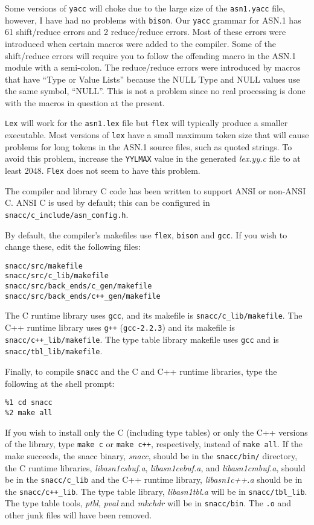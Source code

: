Some versions of \verb$yacc$ will choke due to the large size of the
\verb$asn1.yacc$ file, however, I have had no problems with \verb$bison$.
Our \verb$yacc$ grammar for ASN.1 has 61 shift/reduce errors and 2
reduce/reduce errors.  Most of these errors were introduced when
certain macros were added to the compiler.  Some of the shift/reduce
errors will require you to follow the offending macro in the ASN.1
module with a semi-colon.  The reduce/reduce errors were introduced by
macros that have ``Type or Value Lists'' because the NULL Type and
NULL values use the same symbol, ``NULL''.  This is not a problem
since no real processing is done with the macros in question at the
present.

\verb$Lex$ will work for the \verb$asn1.lex$ file but \verb$flex$ will typically
produce a smaller executable.  Most versions of \verb$lex$ have a small
maximum token size that will cause problems for long tokens in the
ASN.1 source files, such as quoted strings.  To avoid this problem,
increase the \verb$YYLMAX$ value in the generated {\em lex.yy.c} file to at least
2048.  \verb$Flex$ does not seem to have this problem.

The compiler and library C code has been written to support ANSI or
non-ANSI C\@.  ANSI C is used by default; this can be configured in
\verb$snacc/c_include/asn_config.h$.

By default, the compiler's makefiles use \verb$flex$, \verb$bison$ and
\verb$gcc$.  If you wish to change these, edit the following files:

\begin{verbatim}
snacc/src/makefile
snacc/src/c_lib/makefile
snacc/src/back_ends/c_gen/makefile
snacc/src/back_ends/c++_gen/makefile
\end{verbatim}

The C runtime library uses \verb$gcc$, and its makefile is
\verb$snacc/c_lib/makefile$.  The C++ runtime library uses \verb$g++$
(\verb$gcc-2.2.3$) and its makefile is \verb$snacc/c++_lib/makefile$.
The type table library makefile uses \verb$gcc$ and is
\verb$snacc/tbl_lib/makefile$.

Finally, to compile \verb$snacc$ and the C and C++ runtime libraries,
type the following at the shell prompt:

\begin{verbatim}
%1 cd snacc
%2 make all
\end{verbatim}

If you wish to install only the C (including type tables) or only the
C++ versions of the library, type \verb$make c$ or \verb$make c++$,
respectively, instead of \verb$make all$.  If the make succeeds, the
snacc binary, {\em snacc}, should be in the \verb$snacc/bin/$
directory, the C runtime libraries, {\em libasn1csbuf.a}, {\em
libasn1cebuf.a}, and {\em libasn1cmbuf.a}, should be in the
\verb$snacc/c_lib$ and the C++ runtime library, {\em libasn1c++.a}
should be in the \verb$snacc/c++_lib$.  The type table library, {\em
libasn1tbl.a} will be in \verb$snacc/tbl_lib$.  The type table tools,
{\em ptbl}, {\em pval} and {\em mkchdr} will be in \verb$snacc/bin$.
The \verb$.o$ and other junk files will have been removed.

